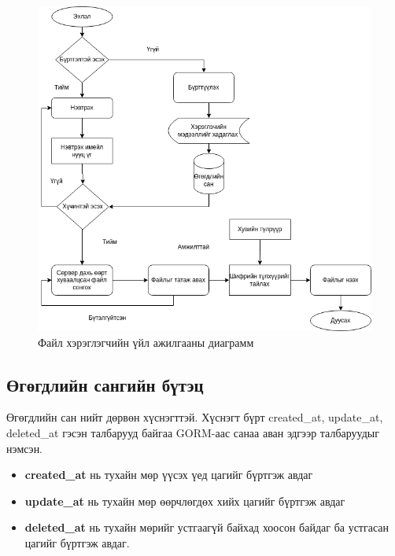 \begin{figure}[H]
    \centering
    \includegraphics[scale=0.5]{Figures/delegatee.drawio.png}
    \caption[pyUmbral]{Файл хэрэглэгчийн үйл ажилгааны диаграмм}
    \label{fig:delegatee_diagram}
\end{figure}

\subsection*{Өгөгдлийн сангийн бүтэц}
Өгөгдлийн сан нийт дөрвөн хүснэгттэй. Хүснэгт бүрт created\_at, update\_at, deleted\_at гэсэн талбарууд байгаа GORM-аас санаа аван эдгээр талбаруудыг нэмсэн.

\begin{itemize}
    \item \textbf{created\_at} нь тухайн мөр үүсэх үед цагийг бүртгэж авдаг
    \item \textbf{update\_at} нь тухайн мөр өөрчлөгдөх хийх цагийг бүртгэж авдаг
    \item \textbf{deleted\_at} нь тухайн мөрийг устгаагүй байхад хоосон байдаг ба устгасан цагийг бүртгэж авдаг.
\end{itemize}

